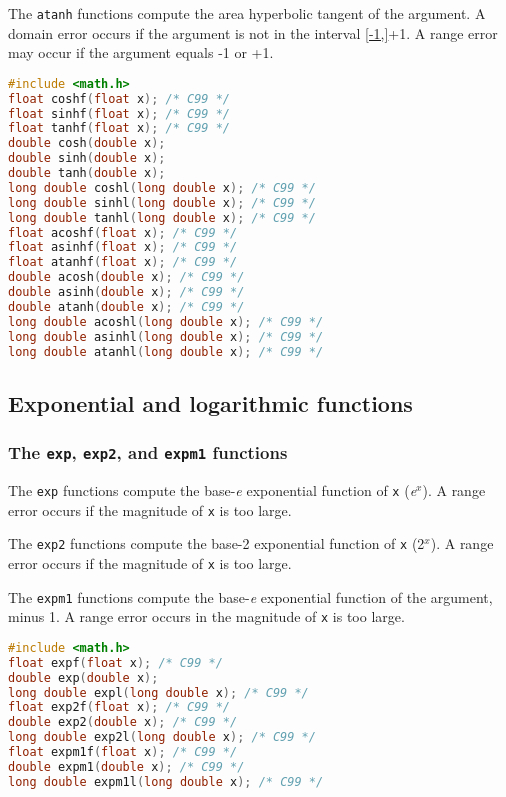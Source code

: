 The \texttt{atanh} functions compute the area hyperbolic tangent of the
argument. A domain error occurs if the argument is not in the interval
\ref{-1,}{+1}. A range error may occur if the argument equals -1 or +1.

\lstset{basicstyle=\scriptsize, numbers=left, captionpos=b, tabsize=4}
\begin{lstlisting}[caption=Section \thesection listing \arabic{furthermathcnt},language={C},
breaklines=true,xleftmargin=15pt,label=lst:section\thesection listing\arabic{furthermathcnt}]
#include <math.h>
float coshf(float x); /* C99 */
float sinhf(float x); /* C99 */
float tanhf(float x); /* C99 */
double cosh(double x); 
double sinh(double x);
double tanh(double x);
long double coshl(long double x); /* C99 */
long double sinhl(long double x); /* C99 */
long double tanhl(long double x); /* C99 */
float acoshf(float x); /* C99 */
float asinhf(float x); /* C99 */
float atanhf(float x); /* C99 */
double acosh(double x); /* C99 */
double asinh(double x); /* C99 */
double atanh(double x); /* C99 */
long double acoshl(long double x); /* C99 */
long double asinhl(long double x); /* C99 */
long double atanhl(long double x); /* C99 */
\end{lstlisting}

\subsection{Exponential and logarithmic functions}
\subsubsection{The \texttt{exp}, \texttt{exp2}, and \texttt{expm1} functions}
The \texttt{exp} functions compute the base-\emph{e} exponential function of
\texttt{x} (\emph{e}\(^{x}\)). A range error occurs if the magnitude of
\texttt{x} is too large.

The \texttt{exp2} functions compute the base-2 exponential function of
\texttt{x} (2\(^{x}\)). A range error occurs if the magnitude of \texttt{x} is
too large.

The \texttt{expm1} functions compute the base-\emph{e} exponential function of
the argument, minus 1. A range error occurs in the magnitude of \texttt{x} is
too large.

\lstset{basicstyle=\scriptsize, numbers=left, captionpos=b, tabsize=4}
\begin{lstlisting}[caption=Section \thesection listing \arabic{furthermathcnt},language={C},
breaklines=true,xleftmargin=15pt,label=lst:section\thesection listing\arabic{furthermathcnt}]
#include <math.h>
float expf(float x); /* C99 */
double exp(double x);
long double expl(long double x); /* C99 */
float exp2f(float x); /* C99 */
double exp2(double x); /* C99 */
long double exp2l(long double x); /* C99 */
float expm1f(float x); /* C99 */
double expm1(double x); /* C99 */
long double expm1l(long double x); /* C99 */
\end{lstlisting}

